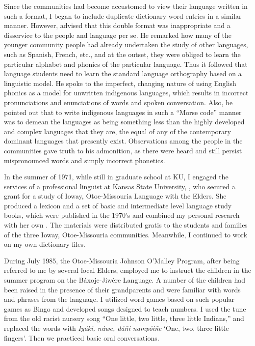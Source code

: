 \documentclass[output=paper]{LSP/langsci}
\begin{document}
Since the communities had become accustomed to view their language written in such a format, I began to include duplicate dictionary word entries in a similar manner. However,  advised that this double format was inappropriate and a disservice to the people and language per se. He remarked how many of the younger community people had already undertaken the study of other languages, such as Spanish, French, etc., and at the outset, they were obliged to learn the particular alphabet and phonics of the particular language. Thus it followed that language students need to learn the standard language orthography based on a linguistic model. He spoke to the imperfect, changing nature of using English phonics as a model for unwritten indigenous languages, which results in incorrect pronunciations and enunciations of words and spoken conversation. Also, he pointed out that to write indigenous languages in such a ``Morse code'' manner was to demean the languages as being something less than the highly developed and complex languages that they are, the equal of any of the contemporary dominant languages that presently exist. Observations among the people in the communities gave truth to his admonition, as there were heard and still persist mispronounced words and simply incorrect phonetics. 

In the summer of 1971, while still in graduate school at KU, I engaged the services of a professional linguist at Kansas State University, , who secured a grant for a study of Ioway, Otoe-Missouria Language with the Elders. She produced a lexicon and a set of basic and intermediate level language study books, which were published in the 1970's and combined my personal research with her own \citep{OtoeIowaWistrandRobinson1977, OtoeIowaWistrandRobinson1978}. The materials were distributed gratis to the students and families of the three Ioway, Otoe-Missouria communities. Meanwhile, I continued to work on my own dictionary files.  

During July 1985, the Otoe-Missouria Johnson O'Malley Program, after being referred to me by several local Elders, employed me to instruct the children in the summer program on the B\'axoje-Jiw\'ere Language. A number of the children had been raised in the presence of their grandparents and were familiar with words and phrases from the language. I utilized word games based on such popular games as Bingo and developed songs designed to teach numbers. I used the tune from the old racist nursery song ``One little, two little, three little Indians,'' and replaced the words with \emph{Iy\'aki, n\'uwe, d\'a\~ni namp\'oi\~ne} `One, two, three little fingers'. Then we practiced basic oral conversations.  
\end{document}
